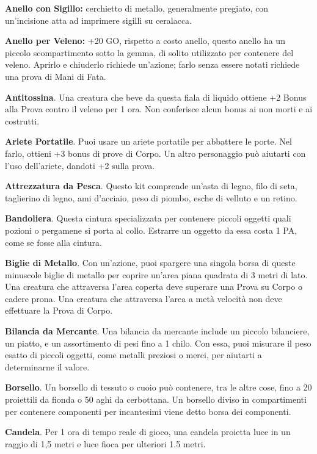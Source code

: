 \documentclass[12pt,a4paper,twoside,openany]{book}
\begin{document}
\begin{multicols}{2}
\textbf{Anello con Sigillo:} cerchietto di metallo, generalmente pregiato, con un'incisione atta ad imprimere sigilli su ceralacca.

\textbf{Anello per Veleno:} +20 GO, rispetto a costo anello, questo anello ha un piccolo scompartimento sotto la gemma, di solito utilizzato per contenere del veleno. Aprirlo e chiuderlo richiede un'azione; farlo senza essere notati richiede una prova di Mani di Fata.

\textbf{Antitossina}. Una creatura che beve da questa fiala di liquido ottiene +2 Bonus alla Prova contro il veleno per 1 ora. Non conferisce alcun bonus ai non morti e ai costrutti.

\textbf{Ariete Portatile}. Puoi usare un ariete portatile per abbattere le porte. Nel farlo, ottieni +3 bonus di prove di Corpo. Un altro personaggio può aiutarti con l’uso dell’ariete, dandoti +2 sulla prova.

\textbf{Attrezzatura da Pesca}. Questo kit comprende un’asta di legno, filo di seta, taglierino di legno, ami d’acciaio, peso di piombo, esche di velluto e un retino.

\textbf{Bandoliera}. Questa cintura specializzata per contenere piccoli oggetti quali pozioni o pergamene si porta al collo. Estrarre un oggetto da essa costa 1 PA, come se fosse alla cintura.

\textbf{Biglie di Metallo}. Con un’azione, puoi spargere una singola borsa di queste minuscole biglie di metallo per coprire un’area piana quadrata di 3 metri di lato. Una creatura che attraversa l’area coperta deve superare una Prova su Corpo o cadere prona. Una creatura che attraversa l’area a metà velocità non deve effettuare la Prova di Corpo.

\textbf{Bilancia da Mercante}. Una bilancia da mercante include un piccolo bilanciere, un piatto, e un assortimento di pesi fino a 1 chilo. Con essa, puoi misurare il peso esatto di piccoli oggetti, come metalli preziosi o merci, per aiutarti a determinarne il valore.

\textbf{Borsello}. Un borsello di tessuto o cuoio può contenere, tra le altre cose, fino a 20 proiettili da fionda o 50 aghi da cerbottana. Un borsello diviso in compartimenti per contenere componenti per incantesimi viene detto borsa dei componenti.

\textbf{Candela}. Per 1 ora di tempo reale di gioco, una candela proietta luce in un raggio di 1,5 metri e luce fioca per ulteriori 1.5 metri.


\end{multicols}
\end{document}

